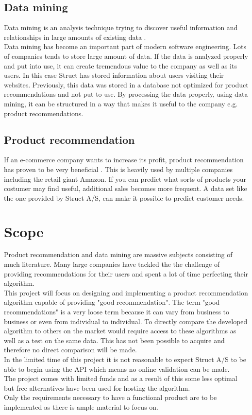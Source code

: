\subsection{Data mining}
Data mining is an analysis technique trying to discover useful information and relationships in large amounts of existing data \cite{dataminingSource}. \\  
Data mining has become an important part of modern software engineering. Lots of companies tends to store large amount of data. If the data is analyzed properly and put into use, it can create tremendous value to the company as well as its users. In this case Struct has stored information about users visiting their websites. Previously, this data was stored in a database not optimized for product recommendations and not put to use. By processing the data properly, using data mining, it can be structured in a way that makes it useful to the company e.g. product recommendations.

\color{black}
\subsection{Product recommendation}
If an e-commerce company wants to increase its profit, product recommendation has proven to be very beneficial \cite{BigCommerce}. This is heavily used by multiple companies including the retail giant Amazon\cite{Fortune}. If you can predict what sorts of products your costumer may find useful, additional sales becomes more frequent. A data set like the one provided by Struct A/S, can make it possible to predict customer needs.

\section{Scope}
Product recommendation and data mining are massive subjects consisting of much literature. Many large companies have tackled the the challenge of providing recommendations for their users and spent a lot of time perfecting their algorithm.\\
This project will focus on designing and implementing a product recommendation algorithm capable of providing "good recommendation". The term "good recommendations" is a very loose term because it can vary from business to business or even from individual to individual. To directly compare the developed algorithm to others on the market would require access to these algorithms as well as a test on the same data. This has not been possible to acquire and therefore no direct comparison will be made. \\
In the limited time of this project it is not reasonable to expect Struct A/S to be able to begin using the API which means no online validation can be made. \\
The project comes with limited funds and as a result of this some less optimal but free alternatives have been used for hosting the algorithm. \\
Only the requirements necessary to have a functional product are to be implemented as there is ample material to focus on.